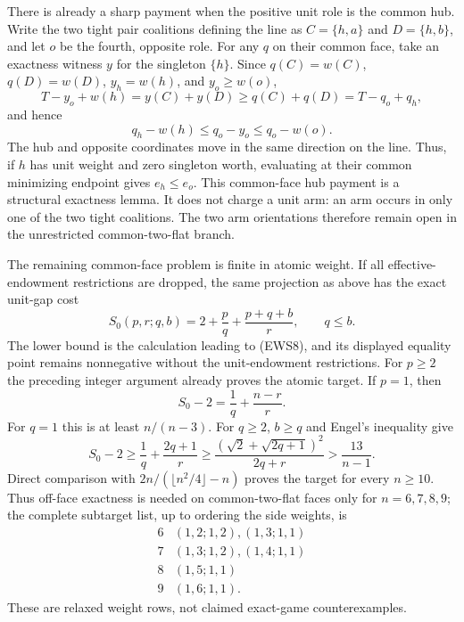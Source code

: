 \documentclass[11pt]{article}
\begin{document}
There is already a sharp payment when the positive unit role is the common
hub.  Write the two tight pair coalitions defining the line as
$C=\{h,a\}$ and $D=\{h,b\}$, and let $o$ be the fourth, opposite role.
For any $q$ on their common face, take an exactness witness $y$ for the
singleton $\{h\}$.  Since $q(C)=w(C)$, $q(D)=w(D)$,
$y_h=w(h)$, and $y_o\geq w(o)$,
\[
 T-y_o+w(h)=y(C)+y(D)\geq q(C)+q(D)=T-q_o+q_h,
\]
and hence
\begin{equation}
 q_h-w(h)\leq q_o-y_o\leq q_o-w(o).                    \tag{EWS20}
\end{equation}
The hub and opposite coordinates move in the same direction on the line.
Thus, if $h$ has unit weight and zero singleton worth, evaluating at their
common minimizing endpoint gives $e_h\leq e_o$.  This common-face hub
payment is a structural exactness lemma.  It does not charge a unit arm:
an arm occurs in only one of the two tight coalitions.  The two arm
orientations therefore remain open in the unrestricted common-two-flat
branch.

The remaining common-face problem is finite in atomic weight.  If all
effective-endowment restrictions are dropped, the same projection as above
has the exact unit-gap cost
\begin{equation}
 S_0(p,r;q,b)=2+\frac pq+\frac{p+q+b}{r},\qquad q\leq b. \tag{EWS21}
\end{equation}
The lower bound is the calculation leading to (EWS8), and its displayed
equality point remains nonnegative without the unit-endowment restrictions.
For $p\geq2$ the preceding integer argument already proves the atomic
target.  If $p=1$, then
\[
 S_0-2=\frac1q+\frac{n-r}{r}.
\]
For $q=1$ this is at least $n/(n-3)$.  For $q\geq2$, $b\geq q$ and Engel's
inequality give
\[
 S_0-2\geq\frac1q+\frac{2q+1}{r}
 \geq\frac{(\sqrt2+\sqrt{2q+1})^2}{2q+r}
 >\frac{13}{n-1}.
\]
Direct comparison with $2n/(\lfloor n^2/4\rfloor-n)$ proves the target for
every $n\geq10$.  Thus off-face exactness is needed on common-two-flat faces
only for $n=6,7,8,9$; the complete subtarget list, up to ordering the side
weights, is
\[
\begin{array}{c|l}
6&(1,2;1,2),(1,3;1,1)\\
7&(1,3;1,2),(1,4;1,1)\\
8&(1,5;1,1)\\
9&(1,6;1,1).
\end{array}                                               \tag{EWS22}
\]
These are relaxed weight rows, not claimed exact-game counterexamples.
\end{document}
